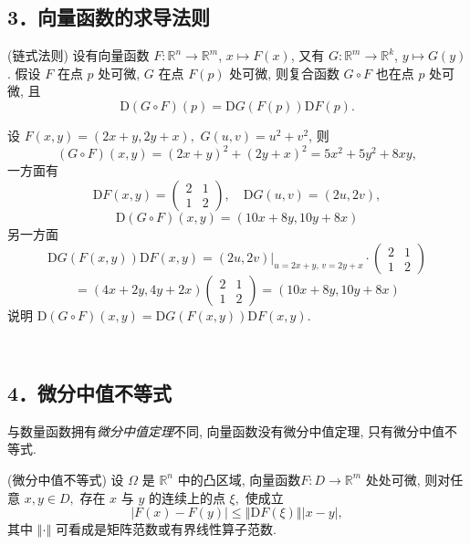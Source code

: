 \subsection{3．向量函数的求导法则}
\begin{theorem}{(链式法则)}
设有向量函数 $F:\mathbb{R}^{n}\rightarrow\mathbb{R}^{m}$, $x\mapsto F(x)$,
又有 $G:\mathbb{R}^{m}\rightarrow\mathbb{R}^{k}$, $y\mapsto G(y)$.
假设 $F$ 在点 $p$ 处可微, $G$ 在点 $F(p)$ 处可微, 则复合函数 $G\circ F$ 也在点 $p$
处可微, 且
\[
\mathrm{D}(G\circ F)(p)=\mathrm{D}G(F(p))\mathrm{D}F(p).
\]
\end{theorem}

\begin{example}{}
设 $F(x,y)=(2x+y,2y+x),$ $G(u,v)=u^{2}+v^{2}$, 则
\[
(G\circ F)(x,y)=(2x+y)^{2}+(2y+x)^{2}=5x^{2}+5y^{2}+8xy,
\]
一方面有 
$$
\mathrm{D}F(x,y)=\left(\begin{array}{cc}
2& 1\\
1 & 2
\end{array}\right),\quad\mathrm{D}G(u,v)=(2u,2v),
$$
\[
\mathrm{D}(G\circ F)(x,y)=(10x+8y,10y+8x)
\]
另一方面 
$$
\mathrm{D}G(F(x,y))\mathrm{D}F(x,y)  =  \left.(2u,2v)\right|_{u=2x+y,\,v=2y+x}\cdot\left(\begin{array}{cc}
2 & 1\\
1 & 2
\end{array}\right)
$$
$$
  =  (4x+2y,4y+2x)\left(\begin{array}{cc}
2 & 1\\
1 & 2
\end{array}\right)
  =  (10x+8y,10y+8x)
$$
 说明 $\mathrm{D}(G\circ F)(x,y)=\mathrm{D}G(F(x,y))\mathrm{D}F(x,y)$. 
\end{example}
\verb| |

\subsection{4．微分中值不等式}
与数量函数拥有\textsl{微分中值定理}不同, 向量函数没有微分中值定理, 只有微分中值不等式. 

\begin{theorem}{(微分中值不等式)}
设 $\Omega$ 是 $\mathbb{R}^{n}$ 中的凸区域, 向量函数$F:D\rightarrow\mathbb{R}^{m}$
处处可微, 则对任意 $x,y\in D,$ 存在 $x$ 与 $y$ 的连续上的点 $\xi,$ 使成立
\[
|F(x)-F(y)|\leqslant\left\Vert \mathrm{D}F(\xi)\right\Vert |x-y|,
\]
其中 $\left\Vert \cdot\right\Vert $ 可看成是矩阵范数或有界线性算子范数. 
\end{theorem}
\verb| |

